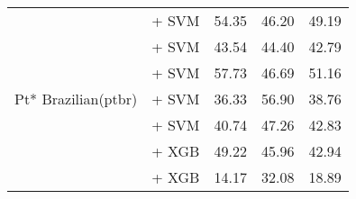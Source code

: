 \begin{longtable}{llccc}
    \midrule
    \multirow{7}{*}{Pt* Brazilian(ptbr)}  & \citep{wang2024multilingual} + SVM                                     & 54.35                                & 46.20              & 49.19             \\
                                          & \citep{filho2023bertportuguesenliassin2} + SVM                         & 43.54                                & 44.40              & 42.79             \\
                                          & \citep{souza2020bertimbau} + SVM                                       & 57.73                                & 46.69              & 51.16             \\
                                          & \citep{melo2023bertlargeportuguesests} + SVM                           & 36.33                                & 56.90              & 38.76             \\
                                          & \citep{sturua2024jinaembeddingsv3multilingualembeddingstask} + SVM     & 40.74                                & 47.26              & 42.83             \\
                                          & \citep{sturua2024jinaembeddingsv3multilingualembeddingstask} + XGB     & 49.22                                & 45.96              & 42.94             \\
                                          & \citep{all-MiniLM-L12-v2} + XGB                                        & 14.17                                & 32.08              & 18.89             \\


\end{longtable}
